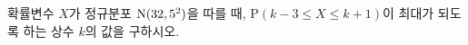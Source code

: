 확률변수 $X$가 정규분포 $\mathrm{N}(32{,}\mkern3mu\mathopen{}5^2)$을 따를 때, $\mathrm{P}(k-3\le X\le k+1)$이 최대가 되도록 하는 상수 $k$의 값을 구하시오.
